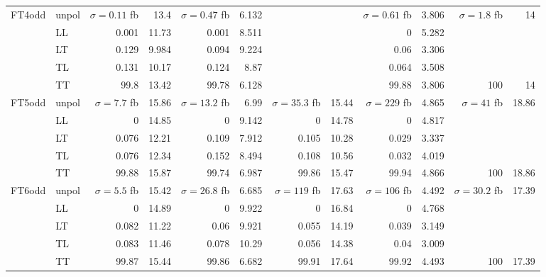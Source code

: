 \begin{table}[h]
{\begin{tabular}{llrrrrrrrrrr}
\multirow{5}{*}{FT4odd}
 & unpol & $\sigma = \num{0.11}$ fb & \num{13.4} & $\sigma = \num{0.47}$ fb & \num{6.132} &  &  & $\sigma = \num{0.61}$ fb & \num{3.806} & $\sigma = \num{1.8}$ fb & \num{14} \\
 & LL & \num{0.001} & \num{11.73} & \num{0.001} & \num{8.511} &  &  & \num{0} & \num{5.282} &  &  \\
 & LT & \num{0.129} & \num{9.984} & \num{0.094} & \num{9.224} &  &  & \num{0.06} & \num{3.306} &  &  \\
 & TL & \num{0.131} & \num{10.17} & \num{0.124} & \num{8.87} &  &  & \num{0.064} & \num{3.508} &  &  \\
 & TT & \num{99.8} & \num{13.42} & \num{99.78} & \num{6.128} &  &  & \num{99.88} & \num{3.806} & \num{100} & \num{14} \\
\midrule
\multirow{5}{*}{FT5odd}
 & unpol & $\sigma = \num{7.7}$ fb & \num{15.86} & $\sigma = \num{13.2}$ fb & \num{6.99} & $\sigma = \num{35.3}$ fb & \num{15.44} & $\sigma = \num{229}$ fb & \num{4.865} & $\sigma = \num{41}$ fb & \num{18.86} \\
 & LL & \num{0} & \num{14.85} & \num{0} & \num{9.142} & \num{0} & \num{14.78} & \num{0} & \num{4.817} &  &  \\
 & LT & \num{0.076} & \num{12.21} & \num{0.109} & \num{7.912} & \num{0.105} & \num{10.28} & \num{0.029} & \num{3.337} &  &  \\
 & TL & \num{0.076} & \num{12.34} & \num{0.152} & \num{8.494} & \num{0.108} & \num{10.56} & \num{0.032} & \num{4.019} &  &  \\
 & TT & \num{99.88} & \num{15.87} & \num{99.74} & \num{6.987} & \num{99.86} & \num{15.47} & \num{99.94} & \num{4.866} & \num{100} & \num{18.86} \\
\midrule
\multirow{5}{*}{FT6odd}
 & unpol & $\sigma = \num{5.5}$ fb & \num{15.42} & $\sigma = \num{26.8}$ fb & \num{6.685} & $\sigma = \num{119}$ fb & \num{17.63} & $\sigma = \num{106}$ fb & \num{4.492} & $\sigma = \num{30.2}$ fb & \num{17.39} \\
 & LL & \num{0} & \num{14.89} & \num{0} & \num{9.922} & \num{0} & \num{16.84} & \num{0} & \num{4.768} &  &  \\
 & LT & \num{0.082} & \num{11.22} & \num{0.06} & \num{9.921} & \num{0.055} & \num{14.19} & \num{0.039} & \num{3.149} &  &  \\
 & TL & \num{0.083} & \num{11.46} & \num{0.078} & \num{10.29} & \num{0.056} & \num{14.38} & \num{0.04} & \num{3.009} &  &  \\
 & TT & \num{99.87} & \num{15.44} & \num{99.86} & \num{6.682} & \num{99.91} & \num{17.64} & \num{99.92} & \num{4.493} & \num{100} & \num{17.39} \\

\end{tabular}}
\end{table}
